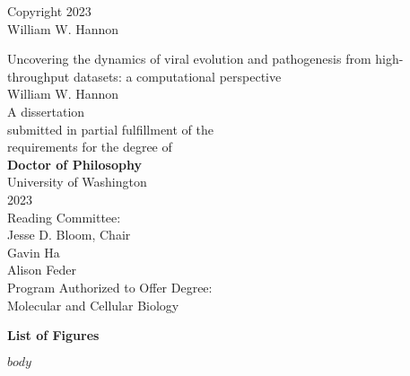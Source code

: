 \documentclass[12pt,oneside,letterpaper]{report}
\begin{document}
\thispagestyle{empty}
\begin{center}
\textcopyright{} Copyright 2023 \\
William W. Hannon
\end{center}
\vspace*{\fill}
\newpage

\thispagestyle{empty}
\begin{center}
\huge{Uncovering the dynamics of viral evolution and pathogenesis from high-throughput datasets: a computational perspective} \\
\vspace{2cm}
\Large{William W. Hannon} \\
\vspace{2cm}
A dissertation \\
submitted in partial fulfillment of the \\
requirements for the degree of \\
\vspace{1cm}
\textbf{Doctor of Philosophy} \\
\vspace{1cm}
University of Washington \\
2023 \\
\vspace{1cm}
Reading Committee: \\
Jesse D. Bloom, Chair \\
Gavin Ha \\
Alison Feder \\
\vspace{1cm}
Program Authorized to Offer Degree: \\
Molecular and Cellular Biology
\end{center}
\newpage


\newpage

\tableofcontents
\newpage

\textbf{List of Figures}
\newpage


\newpage

$body$
\newpage

 

\end{document}
